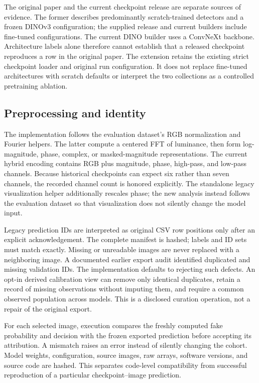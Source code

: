 \documentclass[conference,10pt,letterpaper]{IEEEtran}
\begin{document}
The original paper and the current checkpoint release are separate sources of evidence. The former describes predominantly scratch-trained detectors and a frozen DINOv3 configuration; the supplied release and current builders include fine-tuned configurations. The current DINO builder uses a ConvNeXt backbone. Architecture labels alone therefore cannot establish that a released checkpoint reproduces a row in the original paper. The extension retains the existing strict checkpoint loader and original run configuration. It does not replace fine-tuned architectures with scratch defaults or interpret the two collections as a controlled pretraining ablation.

\subsection{Preprocessing and identity}
The implementation follows the evaluation dataset's RGB normalization and Fourier helpers. The latter compute a centered FFT of luminance, then form log-magnitude, phase, complex, or masked-magnitude representations. The current hybrid encoding contains RGB plus magnitude, phase, high-pass, and low-pass channels. Because historical checkpoints can expect six rather than seven channels, the recorded channel count is honored explicitly. The standalone legacy visualization helper additionally rescales phase; the new analysis instead follows the evaluation dataset so that visualization does not silently change the model input.

Legacy prediction IDs are interpreted as original CSV row positions only after an explicit acknowledgement. The complete manifest is hashed; labels and ID sets must match exactly. Missing or unreadable images are never replaced with a neighboring image. A documented earlier export audit identified duplicated and missing validation IDs. The implementation defaults to rejecting such defects. An opt-in derived calibration view can remove only identical duplicates, retain a record of missing observations without imputing them, and require a common observed population across models. This is a disclosed curation operation, not a repair of the original export.

For each selected image, execution compares the freshly computed fake probability and decision with the frozen exported prediction before accepting its attribution. A mismatch raises an error instead of silently changing the cohort. Model weights, configuration, source images, raw arrays, software versions, and source code are hashed. This separates code-level compatibility from successful reproduction of a particular checkpoint--image prediction.
\end{document}

